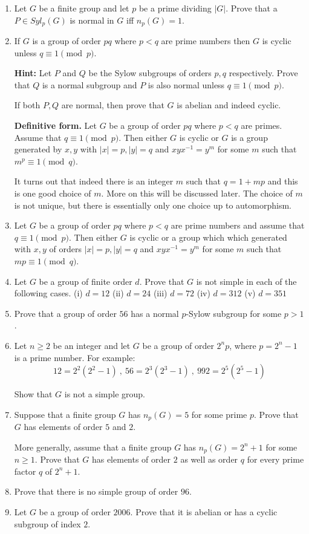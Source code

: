 \documentclass[12pt]{article}
\begin{document}
\begin{enumerate}
\item Let $G$ be a finite group and let $p$ be a prime dividing $|G|$.
Prove that a $P\in Syl_p(G)$ is normal in $G$ iff $n_p(G)=1$.

\item If $G$ is a group of order $pq$ where $p<q$ are prime numbers then
$G$ is cyclic unless $q\equiv 1 \pmod{p}$.

{\bf Hint:} Let $P$ and $Q$ be the Sylow subgroups of orders $p,q$
respectively. Prove that $Q$ is a normal subgroup and $P$ is also normal
unless $q\equiv 1 \pmod{p}$.

If both $P,Q$ are normal, then prove that $G$ is abelian and indeed
cyclic.

{\bf Definitive form.} Let $G$ be a group of order $pq$ where $p<q$
are primes. Assume that $q \equiv 1 \pmod{p}$. Then either $G$ is cyclic
or $G$ is a group generated by $x,y$ with $|x|=p,|y|=q$ and
$xyx^{-1}=y^m$ for some $m$ such that $m^p\equiv 1 \pmod{q}$.

It turns out that indeed there is an integer $m$ such that  $q=1+mp$ and
this is one good choice of $m$.
More on this will be discussed later. The choice of $m$ is not unique,
but there is essentially only one choice up to automorphism.

\item Let $G$ be a group of order $pq$ where $p<q$ are prime numbers and
assume that  $q\equiv 1 \pmod{p}$.
Then either $G$ is cyclic or a group which which generated with $x,y$ of
orders $|x|=p,|y|=q$ and $xyx^{-1}=y^m$ for some $m$ such that $mp\equiv
1 \pmod{q}$.

\item Let $G$ be a group of finite order $d$. Prove that $G$ is not
simple in each of the following cases.
(i) $d=12$ (ii) $d=24$ (iii) $d=72$ (iv) $d=312$ (v) $d=351$

\item Prove that a group of order $56$ has a normal $p$-Sylow subgroup
for some $p>1$.

\item Let $n\geq 2$ be an integer and let $G$ be a group of order 
$2^n p$, where $p=2^n - 1 $ is a prime number. For example: 
$$12=2^2(2^2-1)~,~56=2^3(2^3-1)~,~992=2^5(2^5-1)$$ 

Show that $G$ is not a simple group.

\item Suppose that a finite group $G$ has $n_p(G)=5$ for some prime $p$.
Prove that $G$ has elements of order $5$ and $2$.

More generally, assume that a finite group $G$ has $n_p(G)=2^n+1$ for
some $n\geq 1$. Prove that $G$ has elements of order $2$ as well as
order $q$ for every prime factor $q$ of $2^n+1$.

\item Prove that there is no simple group of order $96$.

\item Let $G$ be a group of order $2006$. Prove that it is abelian or
has a cyclic subgroup of index $2$.

\end{enumerate}
\end{document}
